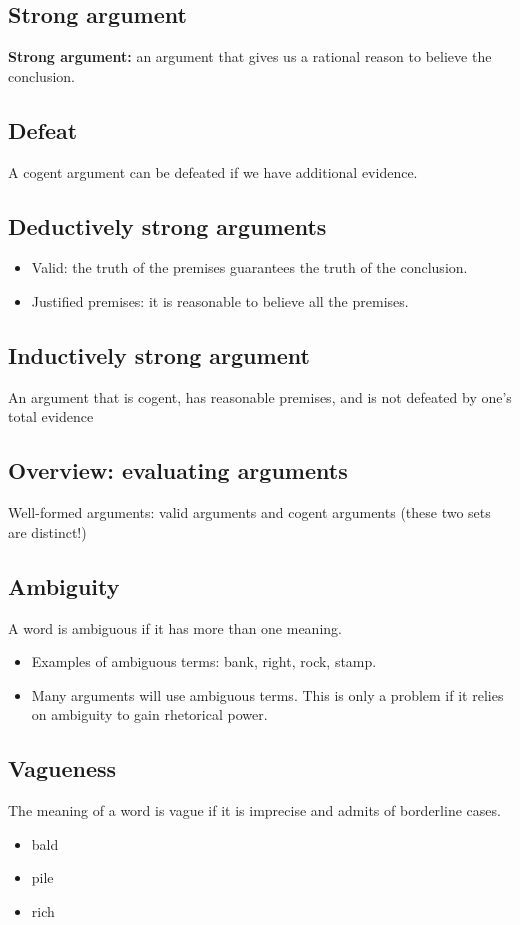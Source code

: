 \subsection{Strong argument}
\textbf{Strong argument: } an argument that gives us a rational reason to
believe the conclusion.

\subsection{Defeat}
A cogent argument can be defeated if we have additional evidence.

\subsection{Deductively strong arguments}

\begin{itemize}
    \item Valid: the truth of the premises guarantees the truth of the
        conclusion.
    \item Justified premises: it is reasonable to believe all the premises.
\end{itemize}

\subsection{Inductively strong argument}
An argument that is cogent, has reasonable premises, and is not defeated by
one's total evidence

\subsection{Overview: evaluating arguments}

Well-formed arguments: valid arguments and cogent arguments (these two sets
are distinct!)

\subsection{Ambiguity}
A word is ambiguous if it has more than one meaning.

\begin{itemize}
    \item Examples of ambiguous terms: bank, right, rock, stamp.
    \item Many arguments will use ambiguous terms. This is only a problem if
        it relies on ambiguity to gain rhetorical power.
\end{itemize}

\subsection{Vagueness}

The meaning of a word is vague if it is imprecise and admits of borderline
cases.

\begin{itemize}
    \item bald
    \item pile
    \item rich
\end{itemize}

